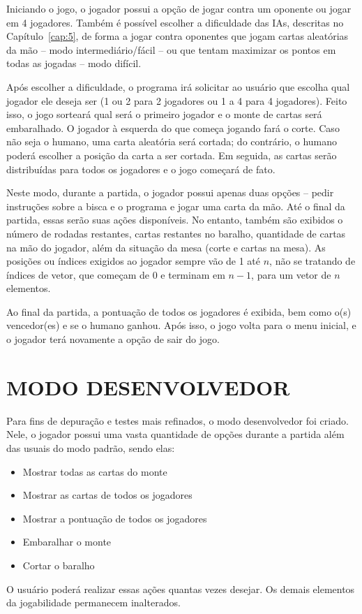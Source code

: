 \documentclass[12pt, oneside, a4paper, brazil]{abntex2}
\begin{document}
Iniciando o jogo, o jogador possui a opção de jogar contra um oponente ou jogar em 4 jogadores. Também é possível escolher a dificuldade das IAs, descritas no Capítulo~\ref{cap:5}, de forma a jogar contra oponentes que jogam cartas aleatórias da mão -- modo intermediário/fácil -- ou que tentam maximizar os pontos em todas as jogadas -- modo difícil. 

Após escolher a dificuldade, o programa irá solicitar ao usuário que escolha qual jogador ele deseja ser (1 ou 2 para 2 jogadores ou 1 a 4 para 4 jogadores). Feito isso, o jogo sorteará qual será o primeiro jogador e o monte de cartas será embaralhado. O jogador à esquerda do que começa jogando fará o corte. Caso não seja o humano, uma carta aleatória será cortada; do contrário, o humano poderá escolher a posição da carta a ser cortada. Em seguida, as cartas serão distribuídas para todos os jogadores e o jogo começará de fato.

Neste modo, durante a partida, o jogador possui apenas duas opções -- pedir instruções sobre a bisca e o programa e jogar uma carta da mão. Até o final da partida, essas serão suas ações disponíveis. No entanto, também são exibidos o número de rodadas restantes, cartas restantes no baralho, quantidade de cartas na mão do jogador, além da situação da mesa (corte e cartas na mesa). As posições ou índices exigidos ao jogador sempre vão de 1 até $n$, não se tratando de índices de vetor, que começam de 0 e terminam em $n - 1$, para um vetor de $n$ elementos. 

Ao final da partida, a pontuação de todos os jogadores é exibida, bem como o(s) vencedor(es) e se o humano ganhou. Após isso, o jogo volta para o menu inicial, e o jogador terá novamente a opção de sair do jogo.

\section{MODO DESENVOLVEDOR}\label{se:modoDev}

Para fins de depuração e testes mais refinados, o modo desenvolvedor foi criado. Nele, o jogador possui uma vasta quantidade de opções durante a partida além das usuais do modo padrão, sendo elas:
\begin{itemize}
    \item Mostrar todas as cartas do monte
    \item Mostrar as cartas de todos os jogadores
    \item Mostrar a pontuação de todos os jogadores
    \item Embaralhar o monte
    \item Cortar o baralho
\end{itemize}
O usuário poderá realizar essas ações quantas vezes desejar. Os demais elementos da jogabilidade permanecem inalterados. 
\end{document}
